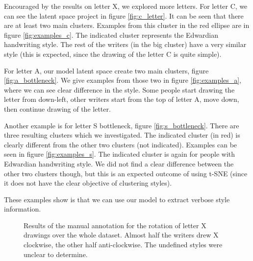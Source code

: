   \par Encouraged by the results on letter X, we explored more letters. For letter C, we can see the latent space project in figure \ref{fig:c_letter}. It can be seen that there are at least two main clusters. Examples from this cluster in the red ellipse are in figure \ref{fig:examples_c}. The indicated cluster represents the Edwardian handwriting style. The rest of the writers (in the big cluster) have a very similar style (this is expected, since the drawing of the letter C is quite simple).

  \par For letter A, our model latent space create two main clusters, figure \ref{fig:a_bottleneck}. We give examples from those two in figure \ref{fig:examples_a}, where we can see clear difference in the style. Some people start drawing the letter from down-left, other writers start from the top of letter A, move down, then continue drawing of the letter.

  \par Another example is for letter S bottleneck, figure \ref{fig:s_bottleneck}. There are three resulting clusters which we investigated. The indicated cluster (in red) is clearly different from the other two clusters (not indicated). Examples can be seen in figure \ref{fig:examples_s}. The indicated cluster is again for people with Edwardian handwriting style. We did not find a clear difference between the other two clusters though, but this is an expected outcome of using t-SNE (since it does not have the clear objective of clustering styles).

  \par These examples show is that we can use our model to extract verbose style information.
  \begin{figure}[htbp!]
      \centering
      \caption{Results of the manual annotation for the rotation of letter X drawings over the whole dataset. Almost half the writers drew X clockwise, the other half anti-clockwise. The undefined styles were unclear to determine.}
      \label{fig:x_rotation}
  \end{figure}

